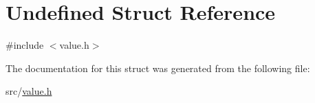 \hypertarget{struct_undefined}{}\section{Undefined Struct Reference}
\label{struct_undefined}


{\ttfamily \#include $<$value.\+h$>$}



The documentation for this struct was generated from the following file\+:\begin{DoxyCompactItemize}
\item 
src/\hyperlink{value_8h}{value.\+h}\end{DoxyCompactItemize}
